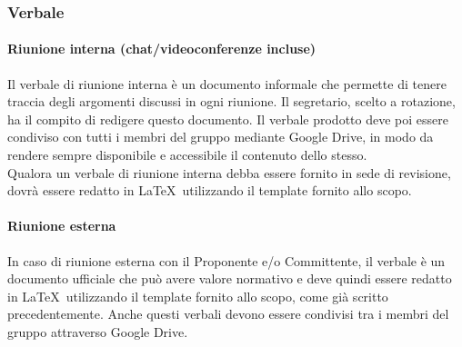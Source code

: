 \documentclass[../NormeDiProgetto.tex]{subfiles}
\begin{document}
			\subsubsection{Verbale}
					\paragraph{Riunione interna (chat/videoconferenze incluse)\\}
						Il verbale di riunione interna è un documento informale che permette di tenere traccia
						degli argomenti discussi in ogni riunione. Il segretario, scelto a rotazione, ha il
						compito di redigere questo documento. Il verbale prodotto deve poi essere condiviso
						con tutti i membri del gruppo mediante Google Drive, in modo da rendere sempre
						disponibile e accessibile il contenuto dello stesso.\\
						Qualora un verbale di riunione interna debba essere fornito in sede di revisione,
						dovrà essere redatto in \LaTeX\ utilizzando il template fornito allo scopo.
					\paragraph{Riunione esterna\\}
						In caso di riunione esterna con il Proponente e/o Committente, il verbale è un
						documento ufficiale che può avere valore normativo e deve quindi essere redatto
						in \LaTeX\ utilizzando il template fornito allo scopo, come già scritto precedentemente.
						Anche questi verbali devono essere condivisi tra i membri del gruppo
						attraverso Google Drive.
\end{document}
